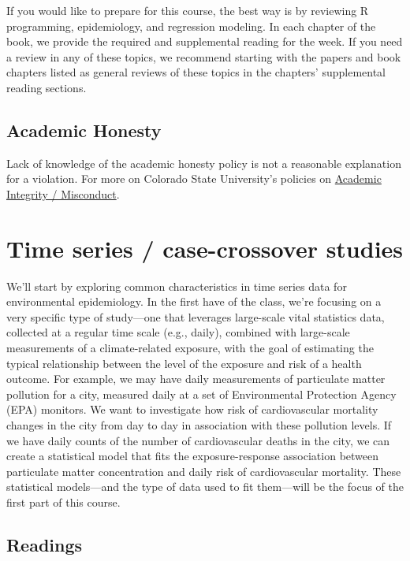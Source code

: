 \documentclass[
]{book}
\begin{document}
If you would like to prepare for this course, the best way is by reviewing
R programming, epidemiology, and regression modeling. In each chapter of the book,
we provide the required and supplemental reading for the week. If you need a review
in any of these topics, we recommend starting with the papers and book chapters
listed as general reviews of these topics in the chapters' supplemental reading
sections.

\hypertarget{academic-honesty}{%
\section{Academic Honesty}\label{academic-honesty}}

Lack of knowledge of the academic honesty policy is not a reasonable explanation for a violation. For more on Colorado State University's policies on \href{https://catalog.colostate.edu/general-catalog/policies/students-responsibilities/\#academic-integrity}{Academic Integrity / Misconduct}.

\hypertarget{time-series-case-crossover-studies}{%
\chapter{Time series / case-crossover studies}\label{time-series-case-crossover-studies}}

We'll start by exploring common characteristics in time series data for
environmental epidemiology. In the first have of the class, we're
focusing on a very specific type of study---one that leverages large-scale
vital statistics data, collected at a regular time scale (e.g., daily),
combined with large-scale measurements of a climate-related exposure, with
the goal of estimating the typical relationship between the level of the
exposure and risk of a health outcome. For example, we may have daily
measurements of particulate matter pollution for a city, measured daily at a set
of Environmental Protection Agency (EPA) monitors. We want to investigate
how risk of cardiovascular mortality changes in the city from day to day
in association with these pollution levels. If we have daily counts of the
number of cardiovascular deaths in the city, we can create a statistical
model that fits the exposure-response association between particulate matter
concentration and daily risk of cardiovascular mortality. These statistical
models---and the type of data used to fit them---will be the focus of the
first part of this course.

\hypertarget{readings}{%
\section{Readings}\label{readings}}
\end{document}
